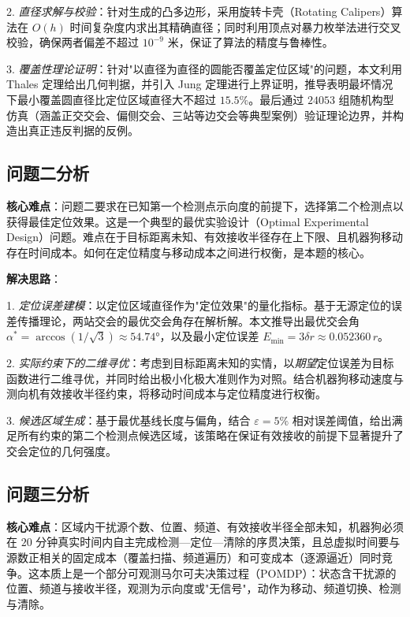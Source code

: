 \documentclass[12pt,a4paper]{ctexart}
\begin{document}
2. \emph{直径求解与校验}：针对生成的凸多边形，采用旋转卡壳（Rotating Calipers）算法在 $O(h)$ 时间复杂度内求出其精确直径；同时利用顶点对暴力枚举法进行交叉校验，确保两者偏差不超过 $10^{-9}$ 米，保证了算法的精度与鲁棒性。

3. \emph{覆盖性理论证明}：针对"以直径为直径的圆能否覆盖定位区域"的问题，本文利用 Thales 定理给出几何判据，并引入 Jung 定理进行上界证明，推导表明最坏情况下最小覆盖圆直径比定位区域直径大不超过 $15.5\%$。最后通过 $24053$ 组随机构型仿真（涵盖正交交会、偏侧交会、三站等边交会等典型案例）验证理论边界，并构造出真正违反判据的反例。

\subsection{问题二分析}

\textbf{核心难点}：问题二要求在已知第一个检测点示向度的前提下，选择第二个检测点以获得最佳定位效果。这是一个典型的最优实验设计（Optimal Experimental Design）问题。难点在于目标距离未知、有效接收半径存在上下限、且机器狗移动存在时间成本。如何在定位精度与移动成本之间进行权衡，是本题的核心。

\textbf{解决思路}：

1. \emph{定位误差建模}：以定位区域直径作为"定位效果"的量化指标。基于无源定位的误差传播理论，两站交会的最优交会角存在解析解。本文推导出最优交会角 $\alpha^{*}=\arccos(1/\sqrt{3})\approx54.74°$，以及最小定位误差 $E_{\min}=3\delta r\approx0.052360\,r$。

2. \emph{实际约束下的二维寻优}：考虑到目标距离未知的实情，以\emph{期望}定位误差为目标函数进行二维寻优，并同时给出极小化极大准则作为对照。结合机器狗移动速度与测向机有效接收半径约束，将移动时间成本与定位精度进行权衡。

3. \emph{候选区域生成}：基于最优基线长度与偏角，结合 $\varepsilon=5\%$ 相对误差阈值，给出满足所有约束的第二个检测点候选区域，该策略在保证有效接收的前提下显著提升了交会定位的几何强度。

\subsection{问题三分析}

\textbf{核心难点}：区域内干扰源个数、位置、频道、有效接收半径全部未知，机器狗必须在 $20$ 分钟真实时间内自主完成检测—定位—清除的序贯决策，且总虚拟时间要与源数正相关的固定成本（覆盖扫描、频道遍历）和可变成本（逐源逼近）同时竞争。这本质上是一个部分可观测马尔可夫决策过程（POMDP）：状态含干扰源的位置、频道与接收半径，观测为示向度或"无信号"，动作为移动、频道切换、检测与清除。
\end{document}
